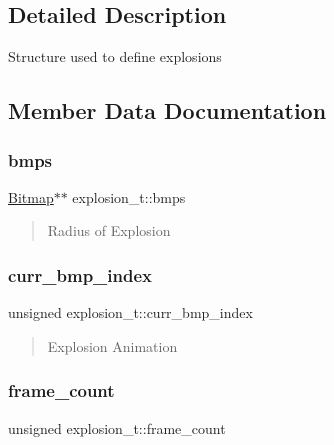 \subsection{Detailed Description}
Structure used to define explosions 

\subsection{Member Data Documentation}
\hypertarget{structexplosion__t_ac70416c24cbc420b431ca0ae420e3c56}{}\label{structexplosion__t_ac70416c24cbc420b431ca0ae420e3c56} 
\subsubsection{\texorpdfstring{bmps}{bmps}}
{\footnotesize\ttfamily \hyperlink{struct_bitmap}{Bitmap}$\ast$$\ast$ explosion\+\_\+t\+::bmps}



\begin{quote}
Radius of Explosion \end{quote}


\hypertarget{structexplosion__t_ada685f079492730e96d875d5d8d4d6f9}{}\label{structexplosion__t_ada685f079492730e96d875d5d8d4d6f9} 
\subsubsection{\texorpdfstring{curr\+\_\+bmp\+\_\+index}{curr\_bmp\_index}}
{\footnotesize\ttfamily unsigned explosion\+\_\+t\+::curr\+\_\+bmp\+\_\+index}



\begin{quote}
Explosion Animation \end{quote}


\hypertarget{structexplosion__t_a84bc7211fa4f7cca4841b6a43e2404d0}{}\label{structexplosion__t_a84bc7211fa4f7cca4841b6a43e2404d0} 
\subsubsection{\texorpdfstring{frame\+\_\+count}{frame\_count}}
{\footnotesize\ttfamily unsigned explosion\+\_\+t\+::frame\+\_\+count}



